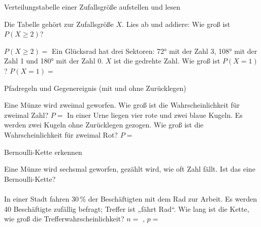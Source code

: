 \setcounter{aufgabe}{0}

\begin{aufgabe}{Verteilungstabelle einer Zufallsgröße aufstellen und lesen}
\begin{teile}
\teil Die Tabelle gehört zur Zufallsgröße $X$. Lies ab und addiere: Wie groß ist $P(X \ge 2)$?

$P(X \ge 2) = $ \leerfeld
\teil Ein Glücksrad hat drei Sektoren: 72° mit der Zahl 3, 108° mit der Zahl 1 und 180° mit der Zahl 0. $X$ ist die gedrehte Zahl. Wie groß ist $P(X = 1)$? $P(X = 1) = $ \leerfeld
\end{teile}
\end{aufgabe}

\begin{aufgabe}{Pfadregeln und Gegenereignis (mit und ohne Zurücklegen)}
\begin{teile}
\teil Eine Münze wird zweimal geworfen. Wie groß ist die Wahrscheinlichkeit für zweimal Zahl? $P = $ \leerfeld
\teil In einer Urne liegen vier rote und zwei blaue Kugeln. Es werden zwei Kugeln ohne Zurücklegen gezogen. Wie groß ist die Wahrscheinlichkeit für zweimal Rot? $P = $ \leerfeld
\end{teile}
\end{aufgabe}

\begin{aufgabe}{Bernoulli-Kette erkennen}
\begin{teile}
\teil Eine Münze wird sechsmal geworfen, gezählt wird, wie oft Zahl fällt. Ist das eine Bernoulli-Kette? \\  \\ 
\teil In einer Stadt fahren 30\,\% der Beschäftigten mit dem Rad zur Arbeit. Es werden 40 Beschäftigte zufällig befragt; Treffer ist „fährt Rad“. Wie lang ist die Kette, wie groß die Trefferwahrscheinlichkeit? $n = $ \leerfeld , $p = $ \leerfeld
\end{teile}
\end{aufgabe}

